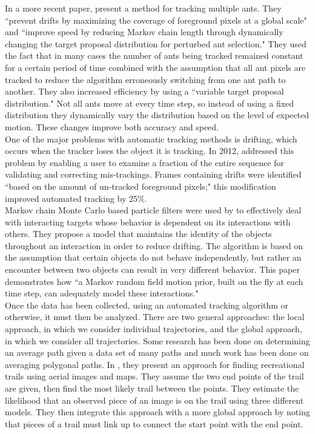 \documentclass[12pt]{article}
\begin{document}
\indent In a more recent paper, \cite{Fletcher11} present a method for tracking multiple ants. They ``prevent drifts by maximizing the coverage of foreground pixels at a global scale" and ``improve speed by reducing Markov chain length through dynamically changing the target proposal distribution for perturbed ant selection." They used the fact that in many cases the number of ants being tracked remained constant for a certain period of time combined with the assumption that all ant pixels are tracked to reduce the algorithm erroneously switching from one ant path to another. They also increased efficiency by using a ``variable target proposal distribution." Not all ants move at every time step, so instead of using a fixed distribution they dynamically vary the distribution based on the level of expected motion. These changes improve both accuracy and speed.\\
\indent One of the major problems with automatic tracking methods is drifting, which occurs when the tracker loses the object it is tracking. In 2012, \cite{Poff12} addressed this problem by enabling a user to examine a fraction of the entire sequence for validating and correcting mis-trackings. Frames containing drifts were identified ``based on the amount of un-tracked foreground pixels;" this modification improved automated tracking by 25\%.\\
\indent Markov chain Monte Carlo based particle filters were used by \cite{Zuria08} to effectively deal with interacting targets whose behavior is dependent on its interactions with others. They propose a model that maintains the identity of the objects throughout an interaction in order to reduce drifting. The algorithm is based on the assumption that certain objects do not behave independently, but rather an encounter between two objects can result in very different behavior. This paper demonstrates how ``a Markov random field motion prior, built on the fly at each time step, can adequately model these interactions."\\
\indent Once the data has been collected, using an automated tracking algorithm or otherwise, it must then be analyzed. There are two general approaches: the local approach, in which we consider individual trajectories, and the global approach, in which we consider all trajectories. Some research has been done on determining an average path given a data set of many paths and much work has been done on averaging polygonal paths. In \cite{Morris}, they present an approach for finding recreational trails using aerial images and maps. They assume the two end points of the trail are given, then find the most likely trail between the points. They estimate the likelihood that an observed piece of an image is on the trail using three different models. They then integrate this approach with a more global approach by noting that pieces of a trail must link up to connect the start point with the end point. \\
\end{document}
